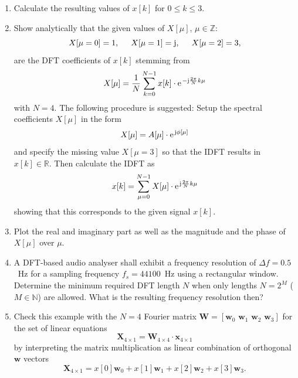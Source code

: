 \documentclass[11pt,a4paper,DIV=12]{scrartcl}
\begin{document}
\begin{enumerate}[label=\alph*)]
	\item Calculate the resulting values of $x[k]$ for $0\leq k\leq3$.
%
	\item Show analytically that the given values of $X[\mu]$, $\mu\in\mathbb{Z}$:
	\begin{equation}
	X[\mu=0]=1, \hspace{5mm} X[\mu=1]=\im, \hspace{5mm} X[\mu=2]=3,
	\end{equation}
	are the DFT coefficients of $x[k]$ stemming from
	\begin{equation}
	X[\mu]=\frac{1}{N}\sum_{k=0}^{N-1}x[k]\cdot\e^{-\im\frac{2\pi}{N}k\mu}
	\end{equation}
	with $N=4$.
%
	The following procedure is suggested: Setup the spectral
	coefficients $X[\mu]$ in the form
	\begin{equation}
	X[\mu]=A[\mu]\cdot\e^{\im\phi[\mu]}
	\end{equation}
	and specify the missing value $X[\mu=3]$ so that the IDFT results in
	$x[k]\in\mathbb{R}$.
%
	Then calculate the IDFT as
	\begin{equation}
	x[k]=\sum_{\mu=0}^{N-1}X[\mu]\cdot\e^{\im\frac{2\pi}{N}k\mu}
	\end{equation}
	showing that this corresponds to the given signal $x[k]$.
%
	\item Plot the real and imaginary part as well as the magnitude and the phase
	of $X[\mu]$ over $\mu$.
%
	\item A DFT-based audio analyser shall exhibit a frequency resolution of
	$\Delta f=0.5$~Hz for a sampling frequency $f_s=44100$~Hz using a rectangular
	window.
%
	Determine the minimum required DFT length $N$ when only lengths $N=2^M$
	($M\in\mathbb{N}$) are allowed.
%
	What is the resulting frequency resolution then?
%
	\item Check this example with the $N=4$ Fourier matrix
	$\mathbf{W} =[\mathbf{w}_0\,\,\mathbf{w}_1\,\,\mathbf{w}_2\,\,\mathbf{w}_3]$
	for the set of linear equations
	\begin{equation}
	\mathbf{X}_{4\times1} = \mathbf{W}_{4\times4} \cdot \mathbf{x}_{4\times1}
	\end{equation}
	by interpreting the matrix multiplication as linear combination of orthogonal
	$\mathbf{w}$ vectors
	\begin{equation}
	\mathbf{X}_{4\times1} = x[0] \mathbf{w}_0
	+ x[1] \mathbf{w}_1 + x[2] \mathbf{w}_2 + x[3] \mathbf{w}_3.
	\end{equation}
\end{enumerate}
\end{document}
